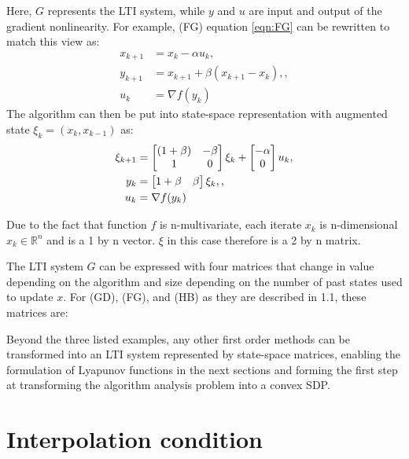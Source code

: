 Here, \(G\) represents the LTI system, while \(y\) and \(u\) are input and output of the gradient nonlinearity. For example, (FG) equation \ref{eqn:FG} can be rewritten to match this view as:
\begin{subequations} \label{eqn:FG2}
	\begin{align}
	  x_{k+1}     &=x_k-\alpha u_k \label{eq_FGstate},       \\
	  y_{k+1} &=x_{k+1}+\beta (x_{k+1}-x_k), \label{eq_FGinterpolated point}, \\
	  u_k &= \nabla f(y_k) \label{eq_FGggradient}
	\end{align}
	\end{subequations}
The algorithm can then be put into state-space representation with augmented state $\xi _k = (x_k, x_{k-1})$ as:
\begin{subequations} \label{eqn:FGss }
	\begin{align}
	  \xi_{k+1} &= \begin{bmatrix}(1+\beta) & -\beta\\ 1 & 0\end{bmatrix}\xi_k  + \begin{bmatrix}-\alpha\\ 0\end{bmatrix}u_k \label{eq_FGssstate}, \\
	  y_k &= \begin{bmatrix}1+\beta & \beta\end{bmatrix}\xi_k, \label{eq_FGssinterpolation},\\
	  u_k &= \nabla f(y_k) \label{eq_FGssgradient}
	\end{align}
	\end{subequations}

Due to the fact that function $f$ is n-multivariate, each iterate $x_k$ is n-dimensional $x_k \in \mathbb{R}^n$ and is a 1 by n vector. $\xi $ in this case therefore is a 2 by n matrix.

The LTI system \(G\) can be expressed with four matrices that change in value depending on the algorithm and size depending on the number of past states used to update \(x\). For (GD), (FG), and (HB) as they are described in 1.1, these matrices are:

Beyond the three listed examples, any other first order methods can be transformed into an LTI system represented by state-space matrices, enabling the formulation of Lyapunov functions in the next sections and forming the first step at transforming the algorithm analysis problem into a convex SDP.

\section{Interpolation condition}

